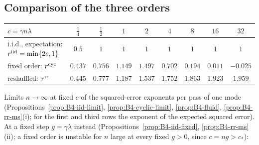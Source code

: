 \subsection{Comparison of the three orders}\label{sec:B4-comparison}

\begin{center}
\footnotesize
\begin{tabular}{@{}lcccccccc@{}}
\toprule
$c=\gamma n\lambda$ & $\frac14$ & $\frac12$ & $1$ & $2$ & $4$ & $8$ & $16$ & $32$ \\
\midrule
i.i.d., expectation: $r^{\rm iid}=\min\{2c,1\}$ & $0.5$ & $1$ & $1$ & $1$ & $1$ & $1$ & $1$ & $1$ \\
fixed order: $r^{\rm cyc}$ & $0.437$ & $0.756$ & $1.149$ & $1.497$ & $0.702$ & $0.194$ & $0.011$ & $-0.025$ \\
reshuffled: $r^{\rm rr}$ & $0.445$ & $0.777$ & $1.187$ & $1.537$ & $1.752$ & $1.863$ & $1.923$ & $1.959$ \\
\bottomrule
\end{tabular}
\end{center}
\noindent Limits $n\to\infty$ at fixed $c$ of the squared-error exponents per pass of one mode (Propositions~\ref{prop:B4-iid-limit}, \ref{prop:B4-cyclic-limit}, \ref{prop:B4-fluid}, \ref{prop:B4-rr-ms}(i); for the first and third rows the exponent of the expected squared error). At a fixed step $g=\gamma\lambda$ instead (Propositions~\ref{prop:B4-iid-fixed}, \ref{prop:B4-rr-ms}(ii); a fixed order is unstable for $n$ large at every fixed $g>0$, since $c=ng>c_\ast$):

